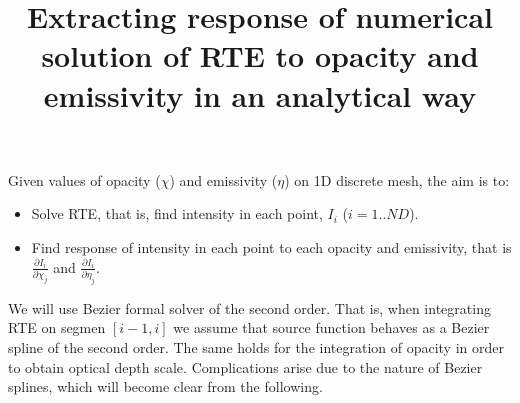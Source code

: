 \documentclass[a4paper,10pt]{article}
\title{Extracting response of numerical solution of RTE to opacity and emissivity in an analytical way}
\author{}
\begin{document}
\maketitle

\begin{abstract}

\end{abstract}

\section{}

Given values of opacity ($\chi$) and emissivity ($\eta$) on 1D discrete mesh, the aim is to:
\begin{itemize}
 \item Solve RTE, that is, find intensity in each point, $I_i$ ($i=1..ND$).
 \item Find response of intensity in each point to each opacity and emissivity, that is $\frac{\partial I_i}{\partial \chi_j}$ and $\frac{\partial I_i}{\partial \eta_j}$.
\end{itemize}
We will use Bezier formal solver of the second order. That is, when integrating RTE on segmen $[i-1,i]$ we assume that source function behaves as a Bezier spline of the second order. The same holds for the integration of opacity in order to obtain optical depth scale. Complications arise due to the nature of Bezier splines, which will become clear from the following. 
\end{document}
